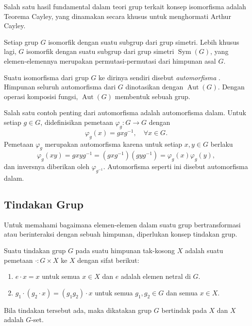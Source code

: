 Salah satu hasil fundamental dalam teori grup terkait konsep isomorfisma adalah Teorema Cayley, yang dinamakan secara khusus untuk menghormati Arthur Cayley.\parencite{subiono2022aljabar}
\begin{teorema}\label{thm:cayley}
  Setiap grup $G$ isomorfik dengan suatu subgrup dari grup simetri. Lebih khusus lagi, $G$ isomorfik dengan suatu subgrup dari grup simetri $\operatorname{Sym}(G)$, yang elemen-elemennya merupakan permutasi-permutasi dari himpunan asal $G$.
\end{teorema}

Suatu isomorfisma dari grup $G$ ke dirinya sendiri disebut \emph{automorfisma} \citep{subiono2022aljabar}. Himpunan seluruh automorfisma dari $G$ dinotasikan dengan $\operatorname{Aut}(G)$. Dengan operasi komposisi fungsi, $\operatorname{Aut}(G)$ membentuk sebuah grup.

Salah satu contoh penting dari automorfisma adalah automorfisma dalam. Untuk setiap $g\in G$, didefinisikan pemetaan
$
  \varphi_g:G\to G
$
dengan
\[
  \varphi_g(x)=gxg^{-1}, \quad \forall x\in G.
\]
Pemetaan $\varphi_g$ merupakan automorfisma karena untuk setiap $x,y\in G$ berlaku
\[
  \varphi_g(xy)=gxyg^{-1}
  =
  (gxg^{-1})(gyg^{-1})
  =
  \varphi_g(x)\varphi_g(y),
\]
dan inversnya diberikan oleh $\varphi_{g^{-1}}$. Automorfisma seperti ini disebut automorfisma dalam.

\subsection{Tindakan Grup}

Untuk memahami bagaimana elemen-elemen dalam suatu grup bertransformasi atau berinteraksi dengan sebuah himpunan, diperlukan konsep tindakan grup.

\begin{definisi}\label{def:tindakan_grup}
  Suatu tindakan grup $G$ pada suatu himpunan tak-kosong $X$ adalah suatu pemetaan $\cdot:G \times X$ ke $X$ dengan sifat berikut:
  \begin{enumerate}
    \item $e\cdot x = x$ untuk semua $x \in X$ dan $e$ adalah elemen netral di $G$.
    \item $g_1\cdot(g_2\cdot x) = (g_1g_2)\cdot x$ untuk semua $g_1, g_2 \in G$ dan semua $x \in X$.
  \end{enumerate}
  Bila tindakan tersebut ada, maka dikatakan grup $G$ bertindak pada $X$ dan $X$ adalah $G$-set.
\end{definisi}

